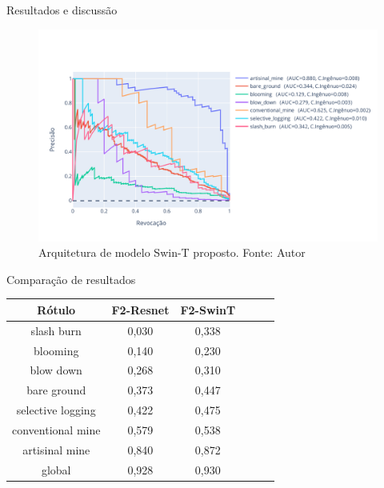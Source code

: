 \documentclass{beamer}
\begin{document}
\begin{frame}{Resultados e discussão}
    \begin{figure}[!ht]
        \centering
        \includegraphics[width=\columnwidth]{Imagens/results/rsp-swin-t_planet_pt/Curva PR para classes raras.pdf}
        \caption{ Arquitetura de modelo Swin-T proposto. Fonte: Autor}
        \label{fig:CurvaPRSwint}
    \end{figure}   
\end{frame}


\begin{frame}{Comparação de resultados}
    \centering
    \begin{tabular}{*{6}{c}}
        \hline
        Rótulo &F2-Resnet&F2-SwinT \\
        \hline
                slash burn &  0,030 &  0,338 \\ 
                  blooming &  0,140 &  0,230 \\
                 blow down &  0,268 &  0,310 \\
               bare ground &  0,373 &  0,447 \\
         selective logging &  0,422 &  0,475 \\
         conventional mine &  0,579 &  0,538 \\
            artisinal mine &  0,840 &  0,872 \\
                    global &  0,928 &  0,930 \\
        \hline
    \end{tabular}    
\end{frame}    
\end{document}
